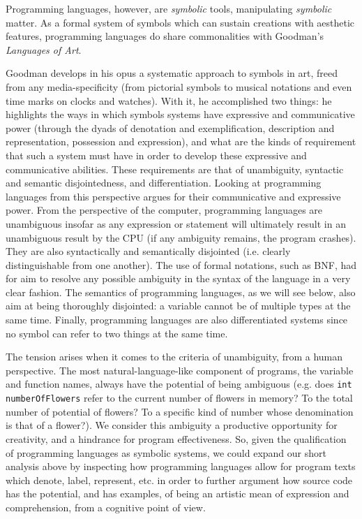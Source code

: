 \documentclass{article}
\begin{document}
Programming languages, however, are \emph{symbolic} tools, manipulating \emph{symbolic} matter. As a formal system of symbols which can sustain creations with aesthetic features, programming languages do share commonalities with Goodman's \emph{Languages of Art}.

Goodman develops in his opus a systematic approach to symbols in art, freed from any media-specificity (from pictorial symbols to musical notations and even time marks on clocks and watches). With it, he accomplished two things: he highlights the ways in which symbols systems have expressive and communicative power (through the dyads of denotation and exemplification, description and representation, possession and expression), and what are the kinds of requirement that such a system must have in order to develop these expressive and communicative abilities. These requirements are that of unambiguity, syntactic and semantic disjointedness, and differentiation\cite{goodman_languages_1976}. Looking at programming languages from this perspective argues for their communicative and expressive power. From the perspective of the computer, programming languages are unambiguous insofar as any expression or statement will ultimately result in an unambiguous result by the CPU (if any ambiguity remains, the program crashes). They are also syntactically and semantically disjointed (i.e. clearly distinguishable from one another). The use of formal notations, such as BNF, had for aim to resolve any possible ambiguity in the syntax of the language in a very clear fashion. The semantics of programming languages, as we will see below, also aim at being thoroughly disjointed: a variable cannot be of multiple types at the same time. Finally, programming languages are also differentiated systems since no symbol can refer to two things at the same time.

The tension arises when it comes to the criteria of unambiguity, from a human perspective. The most natural-language-like component of programs, the variable and function names, always have the potential of being ambiguous (e.g. does \lstinline{int numberOfFlowers} refer to the current number of flowers in memory? To the total number of potential of flowers? To a specific kind of number whose denomination is that of a flower?). We consider this ambiguity a productive opportunity for creativity, and a hindrance for program effectiveness. So, given the qualification of programming languages as symbolic systems, we could expand our short analysis above by inspecting how programming languages allow for program texts which denote, label, represent, etc. in order to further argument how source code has the potential, and has examples, of being an artistic mean of expression and comprehension, from a cognitive point of view.
\end{document}
